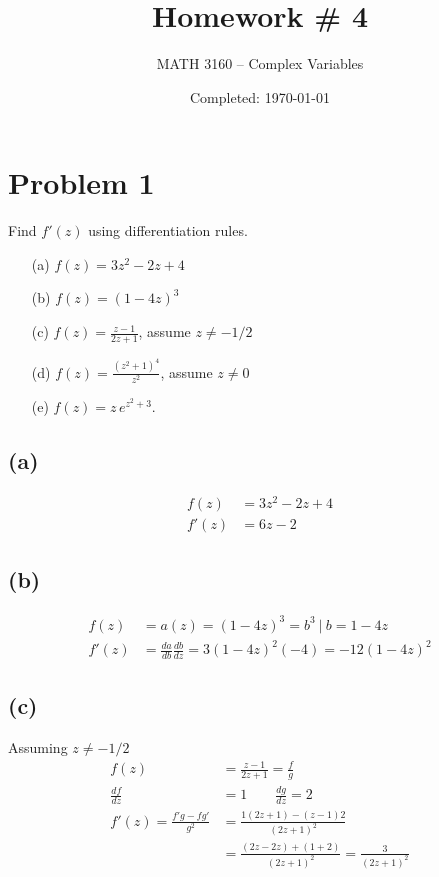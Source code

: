 \documentclass{article}
\title{Homework \# 4}
\author{
	MATH 3160 -- Complex Variables\\
	\myauthor
}
\date{Completed: \today}
\newcommand{\der}[2]{\frac{d#1}{d#2}}
\begin{document}
\maketitle %


\section*{Problem 1}
Find $f'(z)$ using differentiation rules.
\begin{enumerate}
	\item[(a)] $f(z) = 3z^2-2z+4$
	\item[(b)] $f(z) = (1-4z)^3$
	\item[(c)] $f(z) = \frac{z-1}{2z+1}$, assume $z\neq -1/2$
	\item[(d)] $f(z) = \frac{(z^2+1)^4}{z^2}$, assume $z\neq 0$
	\item[(e)] $f(z) = z \, e^{z^2 + 3}$.
\end{enumerate}

\subsection*{(a)}
\begin{align*}
	f(z)  & = 3z^2-2z+4 \\
	f'(z) & = 6z - 2
\end{align*}
\subsection*{(b)}
\begin{align*}
	f(z)  & = a(z) = (1-4z)^3 = b^3 \ |\ b = 1-4z                \\
	f'(z) & = \der{a}{b}\der{b}{z} = 3(1-4z)^2(-4) = -12(1-4z)^2
\end{align*}
\subsection*{(c)}
Assuming $z\neq -1/2$
\begin{align*}
	f(z)                          & = \frac{z-1}{2z+1} = \frac{f}{g}                        \\
	\der{f}{z}                    & = 1 \quad \quad \der{g}{z} = 2                          \\
	f'(z) = \frac{f'g - fg'}{g^2} & =  \frac{1(2z+1) - (z - 1)2}{(2z+1)^2}                  \\
	                              & = \frac{(2z-2z) + (1+2)}{(2z+1)^2} = \frac{3}{(2z+1)^2}
\end{align*}
\end{document}
